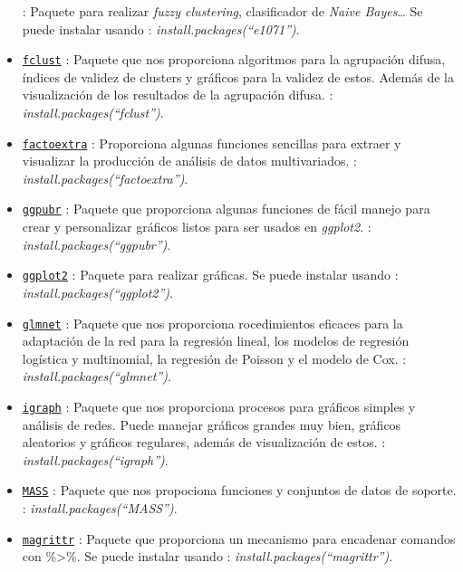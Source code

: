 \documentclass[spanish,]{article}
\begin{document}
\begin{itemize}
  : Paquete para realizar \emph{fuzzy clustering}, clasificador de
  \emph{Naive Bayes}\ldots{} Se puede instalar usando :
  \emph{install.packages(``e1071'')}.
\item
  \href{https://cran.r-project.org/web/packages/fclust/fclust.pdf}{\texttt{fclust}}
  : Paquete que nos proporciona algoritmos para la agrupación difusa,
  índices de validez de clusters y gráficos para la validez de estos.
  Además de la visualización de los resultados de la agrupación difusa.
  : \emph{install.packages(``fclust'')}.
\item
  \href{https://cran.r-project.org/web/packages/factoextra/factoextra.pdf}{\texttt{factoextra}}
  : Proporciona algunas funciones sencillas para extraer y visualizar la
  producción de análisis de datos multivariados. :
  \emph{install.packages(``factoextra'')}.
\item
  \href{https://cran.r-project.org/web/packages/ggpubr/ggpubr.pdf}{\texttt{ggpubr}}
  : Paquete que proporciona algunas funciones de fácil manejo para crear
  y personalizar gráficos listos para ser usados en \emph{ggplot2}. :
  \emph{install.packages(``ggpubr'')}.
\item
  \href{https://cran.r-project.org/web/packages/ggplot2/ggplot2.pdf}{\texttt{ggplot2}}
  : Paquete para realizar gráficas. Se puede instalar usando :
  \emph{install.packages(``ggplot2'')}.
\item
  \href{enlace}{\texttt{glmnet}} : Paquete que nos proporciona
  rocedimientos eficaces para la adaptación de la red para la regresión
  lineal, los modelos de regresión logística y multinomial, la regresión
  de Poisson y el modelo de Cox. : \emph{install.packages(``glmnet'')}.
\item
  \href{https://cran.r-project.org/web/packages/igraph/igraph.pdf}{\texttt{igraph}}
  : Paquete que nos proporciona procesos para gráficos simples y
  análisis de redes. Puede manejar gráficos grandes muy bien, gráficos
  aleatorios y gráficos regulares, además de visualización de estos. :
  \emph{install.packages(``igraph'')}.
\item
  \href{https://cran.r-project.org/web/packages/MASS/MASS.pdf}{\texttt{MASS}}
  : Paquete que nos propociona funciones y conjuntos de datos de
  soporte. : \emph{install.packages(``MASS'')}.
\item
  \href{https://cran.r-project.org/web/packages/magrittr/magrittr.pdf}{\texttt{magrittr}}
  : Paquete que proporciona un mecanismo para encadenar comandos con
  \%\textgreater{}\%. Se puede instalar usando :
  \emph{install.packages(``magrittr'')}.

\end{itemize}
\end{document}
